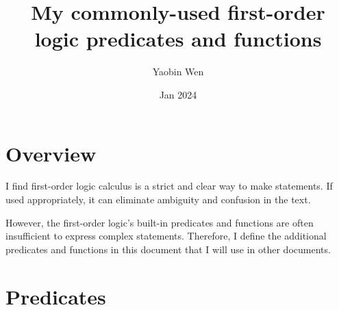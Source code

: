\documentclass[12pt, letterpaper, oneside]{book}
\title{My commonly-used first-order logic predicates and functions}
\author{Yaobin Wen}
\date{Jan 2024}
\begin{document}
\maketitle
\tableofcontents

\chapter*{Overview}

I find first-order logic calculus is a strict and clear way to make statements. If used appropriately, it can eliminate
ambiguity and confusion in the text.

However, the first-order logic's built-in predicates and functions are often insufficient to express complex statements.
Therefore, I define the additional predicates and functions in this document that I will use in other documents.

%
\chapter{Predicates}
%
\end{document}
